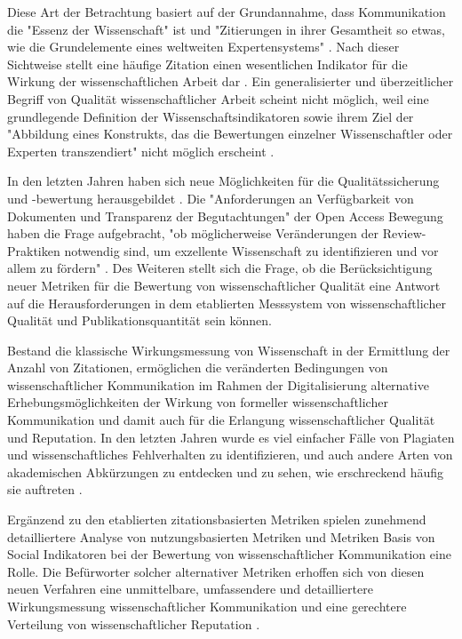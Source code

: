 Diese Art der Betrachtung basiert auf der Grundannahme, dass Kommunikation die "Essenz der Wissenschaft" \cite{bonitz_1998_matthaus} ist und "Zitierungen in ihrer Gesamtheit so etwas, wie die Grundelemente eines weltweiten Expertensystems" \cite{bonitz_1990_sci}. Nach dieser Sichtweise stellt eine häufige Zitation einen wesentlichen Indikator für die Wirkung der wissenschaftlichen Arbeit dar \cite{hamilton_1990_publishing}. Ein generalisierter und überzeitlicher Begriff von Qualität wissenschaftlicher Arbeit scheint nicht möglich, weil eine grundlegende Definition der Wissenschaftsindikatoren sowie ihrem Ziel der "Abbildung eines Konstrukts, das die Bewertungen einzelner Wissenschaftler oder Experten transzendiert" nicht möglich erscheint \cite{Hornbostel_1997}.

In den letzten Jahren haben sich neue Möglichkeiten für die Qualitätssicherung und -bewertung herausgebildet \cite{rekdal_2014_academic}. Die "Anforderungen an Verfügbarkeit von Dokumenten und Transparenz der Begutachtungen" der Open Access Bewegung haben die Frage aufgebracht, "ob möglicherweise Veränderungen der Review-Praktiken notwendig sind, um exzellente Wissenschaft zu identifizieren und vor allem zu fördern" \cite{suchen_Hornbostel_2006}. Des Weiteren stellt sich die Frage, ob die Berücksichtigung neuer Metriken für die Bewertung von wissenschaftlicher Qualität eine Antwort auf die Herausforderungen in dem etablierten Messsystem von wissenschaftlicher Qualität und Publikationsquantität sein können.

Bestand die klassische Wirkungsmessung von Wissenschaft in der Ermittlung der Anzahl von Zitationen, ermöglichen die veränderten Bedingungen von wissenschaftlicher Kommunikation im Rahmen der Digitalisierung alternative Erhebungsmöglichkeiten der Wirkung von formeller wissenschaftlicher Kommunikation und damit auch für die Erlangung wissenschaftlicher Qualität und Reputation. In den letzten Jahren wurde es viel einfacher Fälle von Plagiaten und wissenschaftliches Fehlverhalten zu identifizieren, und auch andere Arten von akademischen Abkürzungen zu entdecken und zu sehen, wie erschreckend häufig sie auftreten \cite{rekdal_2014_academic}.

Ergänzend zu den etablierten zitationsbasierten Metriken spielen zunehmend detailliertere Analyse von nutzungsbasierten Metriken und Metriken Basis von Social Indikatoren \cite{peters_2015_research} bei der Bewertung von wissenschaftlicher Kommunikation eine Rolle. Die Befürworter solcher alternativer Metriken erhoffen sich von diesen neuen Verfahren eine unmittelbare, umfassendere und detailliertere Wirkungsmessung wissenschaftlicher Kommunikation und eine gerechtere Verteilung von wissenschaftlicher Reputation \cite{peters_2015_research} \cite{cite:17} \cite{dora_2013}.


